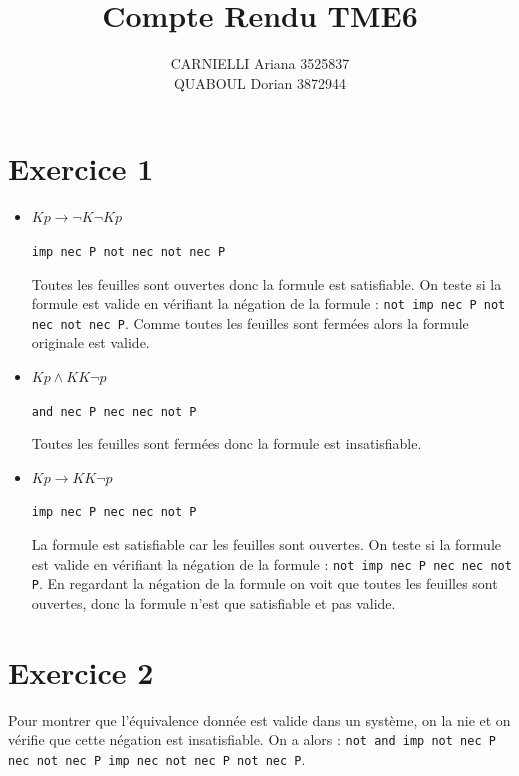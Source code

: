 \documentclass[a4paper,11pt]{amsart}
\theoremstyle{plain}
\begin{document}

\pagestyle{plain}

\title{Compte Rendu TME6}
\author{CARNIELLI Ariana 3525837 \\
QUABOUL Dorian 3872944
}
\maketitle

\section*{Exercice 1}

\begin{itemize}
\item $Kp \to \lnot K \lnot Kp$

\texttt{imp nec P not nec not nec P} 

Toutes les feuilles sont ouvertes donc la formule est satisfiable. On teste si la formule est valide en vérifiant la négation de la formule : \texttt{not imp nec P not nec not nec P}. Comme toutes les feuilles sont fermées alors la formule originale est valide.

\item $Kp \land K K \lnot p$

\texttt{and nec P nec nec not P}

Toutes les feuilles sont fermées donc la formule est insatisfiable.

\item $Kp \to K K \lnot p$

\texttt{imp nec P nec nec not P}

La formule est satisfiable car les feuilles sont ouvertes. On teste si la formule est valide en vérifiant la négation de la formule :  \texttt{not imp nec P nec nec not P}. En regardant la négation de la formule on voit que toutes les feuilles sont ouvertes, donc la formule n'est que satisfiable et pas valide.
\end{itemize}

\section*{Exercice 2}

Pour montrer que l'équivalence donnée est valide dans un système, on la nie et on vérifie que cette négation est insatisfiable. On a alors : \texttt{not and imp not nec P nec not nec P imp nec not nec P not nec P}.
\end{document}
